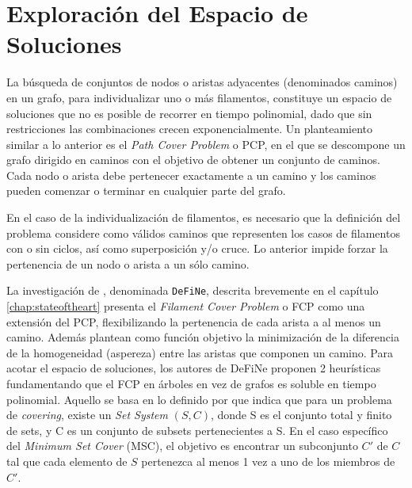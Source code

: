 \section{Exploraci\'on del Espacio de Soluciones}

La b\'usqueda de conjuntos de nodos o aristas adyacentes (denominados caminos) en un grafo, para individualizar uno o m\'as filamentos, constituye un espacio de soluciones que no es posible de recorrer en tiempo polinomial, dado que sin restricciones las combinaciones crecen exponencialmente\cite{buchin2007number}\cite{biswas2012hamiltonian}. Un planteamiento similar a lo anterior es el {\it Path Cover Problem} o PCP, en el que se descompone un grafo dirigido en caminos con el objetivo de obtener un conjunto de caminos. Cada nodo o arista debe pertenecer exactamente a un camino y los caminos pueden comenzar o terminar en cualquier parte del grafo.

En el caso de la individualizaci\'on de filamentos, es necesario que la definici\'on del problema considere como v\'alidos caminos que representen los casos de filamentos con o sin ciclos, as\'i como superposici\'on y/o cruce. Lo anterior impide forzar la pertenencia de un nodo o arista a un s\'olo camino. 

La investigaci\'on de \cite{breuer2015define}, denominada {\tt DeFiNe}, descrita brevemente en el cap\'itulo \ref{chap:stateoftheart} presenta el {\it Filament Cover Problem} o FCP como una extensi\'on del PCP, flexibilizando la pertenencia de cada arista a al menos un camino. Adem\'as plantean como funci\'on objetivo la minimizaci\'on de la diferencia de la homogeneidad (aspereza) entre las aristas que componen un camino. Para acotar el espacio de soluciones, los autores de DeFiNe proponen 2 heur\'isticas fundamentando que el FCP en \'arboles en vez de grafos es soluble en tiempo polinomial. Aquello se basa en lo definido por \cite{lin2006vertex} que indica que para un problema de {\it covering}, existe un {\it Set System} $(S,C)$, donde S es el conjunto total y finito de sets, y C es un conjunto de subsets pertenecientes a S. En el caso espec\'ifico del {\it Minimum Set Cover} (MSC), el objetivo es encontrar un subconjunto $C'$ de $C$ tal que cada elemento de $S$ pertenezca al menos 1 vez a uno de los miembros de $C'$.


